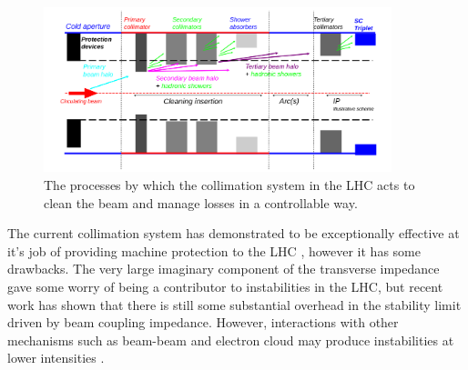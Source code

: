 \begin{figure}
\begin{center}
\includegraphics[width=0.9\textwidth]{LHC_Collimation_Upgrades/figures/collimationSchematic.pdf}
\end{center}
\caption{The processes by which the collimation system in the LHC acts to clean the beam and manage losses in a controllable way.}
\label{fig:colSystemLayout}
\end{figure}

The current collimation system has demonstrated to be exceptionally effective at it's job of providing machine protection to the LHC \cite{Zerlauth:MP}, however it has some drawbacks. The very large imaginary component of the transverse impedance gave some worry of being a contributor to instabilities in the LHC, but recent work has shown that there is still some substantial overhead in the stability limit driven by beam coupling impedance. However, interactions with other mechanisms such as beam-beam and electron cloud may produce instabilities at lower intensities \cite{Mounet:PhDThesis}. 

